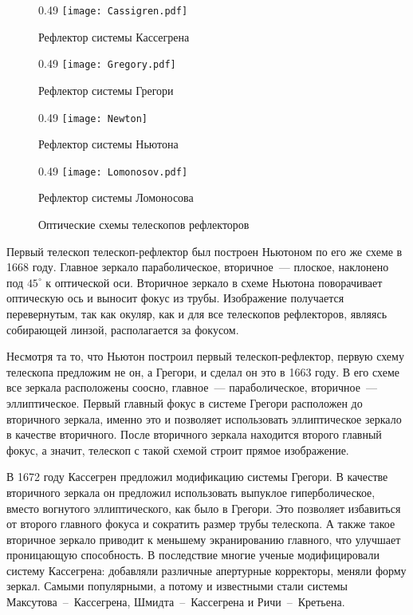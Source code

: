 \vspace{-.3pc}
\begin{figure}[h!]
	\begin{subcaptionblock}{0.49\tw}
		\texttt{[image: Cassigren.pdf]}
		\caption{Рефлектор системы Кассегрена}
	\end{subcaptionblock}
	\hfill
	\begin{subcaptionblock}{0.49\tw}
		\texttt{[image: Gregory.pdf]}
		\caption{Рефлектор системы Грегори}
		\label{Gregory}
	\end{subcaptionblock}
	\vskip4pt
	\begin{subcaptionblock}{0.49\tw}
		\texttt{[image: Newton]}
		\caption{Рефлектор системы Ньютона}
	\end{subcaptionblock}
	\hfill
	\begin{subcaptionblock}{0.49\tw}
		\texttt{[image: Lomonosov.pdf]}
		\caption{Рефлектор системы Ломоносова}
	\end{subcaptionblock}
	\caption{Оптические схемы телескопов рефлекторов}
\end{figure}

Первый телескоп телескоп-рефлектор был построен Ньютоном по его же схеме в 1668 году. Главное зеркало параболическое, вторичное~--- плоское, наклонено под $45^\circ$ к оптической оси. Вторичное зеркало в схеме Ньютона поворачивает оптическую ось и выносит фокус из трубы. Изображение получается перевернутым, так как окуляр, как и для все телескопов рефлекторов, являясь собирающей линзой, располагается за фокусом.

Несмотря та то, что Ньютон построил первый телескоп-рефлектор, первую схему телескопа предложим не он, а Грегори, и сделал он это в 1663 году. В его схеме все зеркала расположены соосно, главное~--- параболическое, вторичное~--- эллиптическое. Первый главный фокус в системе Грегори расположен до вторичного зеркала, именно это и позволяет использовать эллиптическое зеркало в качестве вторичного. После вторичного зеркала находится второго главный фокус, а значит, телескоп с такой схемой строит прямое изображение.

В 1672 году Кассегрен предложил модификацию системы Грегори. В качестве вторичного зеркала он предложил использовать выпуклое гиперболическое, вместо вогнутого эллиптического, как было в Грегори. Это позволяет избавиться от второго главного фокуса и сократить размер трубы телескопа. А также такое вторичное зеркало приводит к меньшему экранированию главного, что улучшает проницающую способность. В последствие многие ученые модифицировали систему Кассегрена: добавляли различные апертурные корректоры, меняли форму зеркал. Самыми популярными, а потому и известными стали системы Максутова~--~Кассегрена, Шмидта~--~Кассегрена и Ричи~--~Кретьена.

